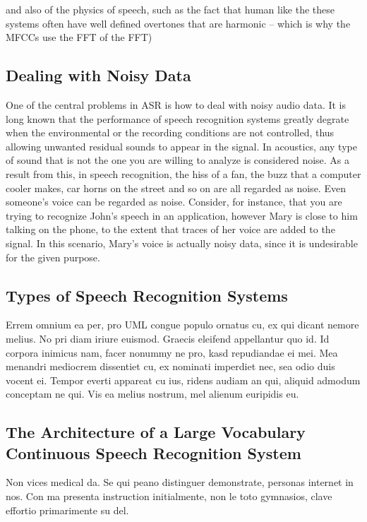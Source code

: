 and also of the physics of speech, such as the fact that human like the these systems often have well defined overtones that are harmonic -- which is why the MFCCs use the FFT of the FFT)


\subsection{Dealing with Noisy Data}

One of the central problems in \ac{ASR} is how to deal with noisy audio data. It is long known that the performance of 
speech recognition systems greatly degrate when the environmental or the recording conditions are not controlled, 
thus allowing unwanted residual sounds to appear in the signal. In acoustics, any type of sound that is not the one
you are willing to analyze is considered noise. As a result from this, in speech recognition, the hiss of a fan, 
the buzz that a computer cooler makes, car horns on the street and so on are all regarded as noise. Even someone's voice
can be regarded as noise. Consider, for instance, that you are trying to recognize John's speech in an application, 
however Mary is close to him talking on the phone, to the extent that traces of her voice are added to the signal. In this
scenario, Mary's voice is actually noisy data, since it is undesirable for the given purpose. 

\subsection{Types of Speech Recognition Systems} 
Errem omnium ea per, pro \ac{UML} congue populo ornatus cu, ex qui
dicant nemore melius. No pri diam iriure euismod. Graecis eleifend
appellantur quo id. Id corpora inimicus nam, facer nonummy ne pro,
kasd repudiandae ei mei. Mea menandri mediocrem dissentiet cu, ex
nominati imperdiet nec, sea odio duis vocent ei. Tempor everti
appareat cu ius, ridens audiam an qui, aliquid admodum conceptam ne
qui. Vis ea melius nostrum, mel alienum euripidis eu.

\subsection{The Architecture of a Large Vocabulary Continuous Speech Recognition System} 
Non vices medical da. Se qui peano distinguer demonstrate, personas
internet in nos. Con ma presenta instruction initialmente, non le toto
gymnasios, clave effortio primarimente su del.

